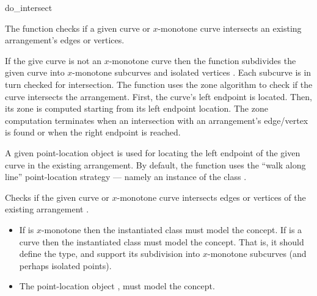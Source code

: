 \ccRefPageBegin

\begin{ccRefFunction}{do_intersect}

\ccDefinition

The function \ccRefName{} checks if a given curve or $x$-monotone
curve intersects an existing arrangement's edges or vertices. 

If the give curve is not an $x$-monotone curve then the function
subdivides the given curve into $x$-monotone subcurves and isolated
vertices . Each subcurve is in turn checked for intersection.
The function uses the zone algorithm to check if the curve intersects
the arrangement. First, the curve's left endpoint is located. Then, 
its zone is computed starting from its left endpoint location. The
zone computation terminates when an intersection with an arrangement's
edge/vertex is found or when the right endpoint is reached. 

A given point-location object is used for locating the left endpoint 
of the given curve in the existing arrangement. By default, the function 
uses the ``walk along line'' point-location strategy --- namely an 
instance of the class 
.



Checks if the given curve or $x$-monotone curve  intersects
  edges or vertices of the existing arrangement .


\ccRequirements
\begin{itemize}
\item If  is $x$-monotone then the instantiated 
  class must model the   concept. If
   is a curve then the instantiated  class must
  model the  concept. That is, it should
  define the  type, and support its subdivision into
  $x$-monotone subcurves (and perhaps isolated points).
\item The point-location object , must model the
   concept.
\end{itemize}

\end{ccRefFunction}

\ccRefPageEnd
